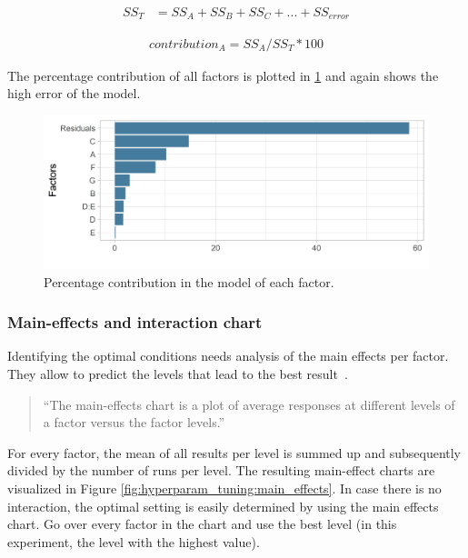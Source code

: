 \begin{equation}
	\begin{split}
		SS_T & = SS_A + SS_B + SS_C + ... + SS_{error}
	\end{split}
	 \label{equ:hyperparam_tuning:ss_t}
\end{equation}

\begin{equation}
	\begin{split}
		contribution_A = SS_A / SS_T * 100
	\end{split}
	 \label{equ:hyperparam_tuning:contribution}
\end{equation}

The percentage contribution of all factors is plotted in \ref{fig:hyperparam_tuning:percentage_contribution} and again shows the high error of the model. 

\begin{figure}[ht] 
	\includegraphics[width=1\linewidth]{simulations/taguchi/plots/percentage_contribution}
	\caption{Percentage contribution in the model of each factor.}
	\label{fig:hyperparam_tuning:percentage_contribution}
\end{figure}

\subsubsection{Main-effects and interaction chart}
Identifying the optimal conditions needs analysis of the main effects per factor. They allow to predict the levels that lead to the best result~\cite{roy_primer_1990}.

\begin{quote}
	\begin{em}
		\enquote{The main-effects chart is a plot of average responses at different levels of a factor versus the factor levels.}~\cite{yang_design_2009}
	\end{em}
\end{quote}

For every factor, the mean of all results per level is summed up and subsequently divided by the number of runs per level. The resulting main-effect charts are visualized in Figure \ref{fig:hyperparam_tuning:main_effects}. In case there is no interaction, the optimal setting is easily determined by using the main effects chart. Go over every factor in the chart and use the best level (in this experiment, the level with the highest value).

